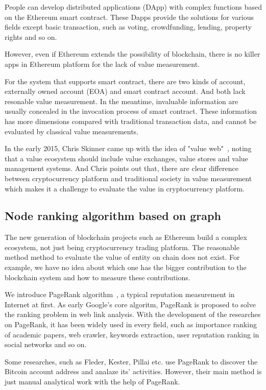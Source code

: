People can develop distributed applications (DApp) with complex functions based on the Ethereum smart contract. These Dapps provide the solutions for various fields except basic transaction, such as voting, crowdfunding, lending, property rights and so on.

However, even if Ethereum extends the possibility of blockchain, there is no killer apps in Ethereum platform for the lack of value measurement.

For the system that supports smart contract, there are two kinds of account, externally owned account (EOA) and smart contract account. And both lack resonable value measurement. In the meantime, invaluable information are usually concealed in the invocation process of smart contract. These information has more dimensions compared with traditional transaction data, and cannot be evaluated by classical value measurements.

In the early 2015, Chris Skinner came up with the idea of "value web"~\cite{ChrisSkinner}, noting that a value ecosystem should include value exchanges, value stores and value management systems. And Chris points out that, there are clear difference between cryptocurrency platform and traditional society in value measurement which makes it a challenge to evaluate the value in cryptocurrency platform.

\subsection{Node ranking algorithm based on graph}
The new generation of blockchain projects such as Ethereum build a complex ecosystem, not just being cryptocurrency trading platform. The reasonable method method to evaluate the value of entity on chain does not exist. For example, we have no idea about which one has the bigger contribution to the blockchain system and how to measure these contributions.

We introduce PageRank algorithm~\cite{page1999pagerank}, a typical reputation measurement in Internet at first. As early Google's core algoritm, PageRank is proposed to solve the ranking problem in web link analysis. With the development of the researches on PageRank, it has been widely used in every field, such as importance ranking of academic papers, web crawler, keywords extraction, user reputation ranking in social networks and so on.

Some researches, such as Fleder, Kester, Pillai etc. use PageRank to discover the Bitcoin account address and analaze its' activities. However, their main method is just manual analytical work with the help of PageRank.

